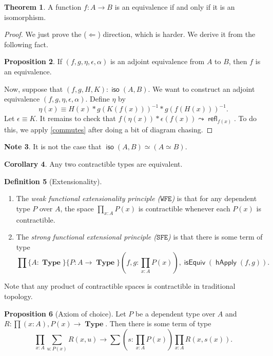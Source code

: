 \documentclass[10pt,letterpaper,cm]{nupset}
\theoremstyle{definition}
\newtheorem{definition}{Definition}[subsection]
\newtheorem{note}[definition]{Note}
\theoremstyle{theorem}
\newtheorem{theorem}[definition]{Theorem}
\newtheorem{prop}[definition]{Proposition}
\newtheorem{corollary}[definition]{Corollary}
\theoremstyle{remark}
\newcommand{\1}{\mathbf{1}}
\newcommand{\wfe}{\mathtt{WFE}}
\newcommand{\sfe}{\mathtt{SFE}}
\newcommand{\0}{\vec 0}
\DeclareMathOperator{\iso}{\mathsf{iso}}
\DeclareMathOperator{\refl}{\mathsf{refl}}
\DeclareMathOperator{\isequiv}{\mathsf{isEquiv}}
\DeclareMathOperator{\happly}{\mathsf{hApply}}
\DeclareMathOperator{\type}{\mathbf{Type}}
\begin{document}
\begin{theorem}
A function $f : A \to B$ is an equivalence if and only if it is an isomorphism.
\end{theorem}
\begin{proof}
We just prove the ($\Longleftarrow$) direction, which is harder. We derive it from the following fact.
\begin{prop}
If $\left(f, g, \eta, \epsilon, \alpha\right)$ is an adjoint equivalence from $A$ to $B$, then $f$ is an equivalence.
\end{prop}
Now, suppose that $\left(f,g,H, K\right): \iso(A,B)$. We want to construct an adjoint equivalence $\left(f, g, \eta,  \epsilon, \alpha\right)$. Define $\eta$ by $$\eta(x) \equiv H(x) \ast g(K(f(x)))^{{-}1} \ast g(f(H(x)))^{{-}1}.$$ Let $\epsilon \equiv K$. 
It remains to check that $f(\eta(x)) \ast \epsilon(f(x)) \leadsto \refl_{f(x)}$.
To do this, we apply \cref{commutes} after doing a bit of diagram chasing.
\end{proof}

\begin{note}
It is not the case that $\iso(A,B) \simeq (A \simeq B)$.
\end{note}

\begin{corollary}
Any two contractible types are equivalent. 
\end{corollary}

\begin{definition}[Extensionality] $ $
\begin{enumerate} 
\item The \textit{weak functional extensionality principle ($\wfe$)} is that for any dependent type $P$ over $A$, the space $\prod_{x:A} {P(x)}$ is contractible whenever each $P(x)$ is contractible. 
\item The \textit{strong functional extensional principle ($\sfe$)} is that there is some term of type $$\prod\{A: \type\}\{P: A \to \type\}\left(f,g: \prod_{x:A} P(x)\right), \isequiv(\happly(f,g)).$$
\end{enumerate}
\end{definition}

Note that any product of contractible spaces is contractible in traditional topology. 

\begin{prop}[Axiom of choice]
Let $P$ be a dependent type over $A$ and $R : \prod(x:A), P(x) \to \type$. Then there is some term of type $$\prod_{x:A}\sum_{u:P(x)} R(x, u) \to \sum\left(s:  \prod_{x:A} P(x)\right) \prod_{x:A}R(x, s(x)) .$$
\end{prop}
\end{document}
